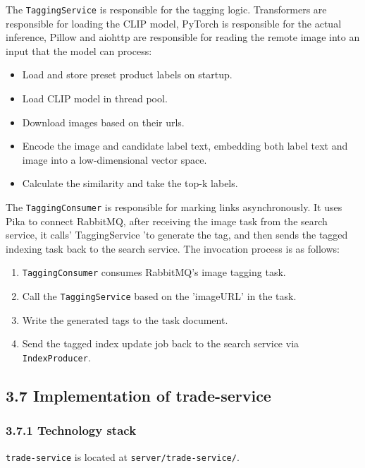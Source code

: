 \documentclass{article}
\begin{document}
The \texttt{TaggingService} is responsible for the tagging logic. Transformers are responsible for loading the CLIP model, PyTorch is responsible for the actual inference, Pillow and aiohttp are responsible for reading the remote image into an input that the model can process:

\begin{itemize}
    \item Load and store preset product labels on startup.
    \item Load CLIP model in thread pool.
    \item Download images based on their urls.
    \item Encode the image and candidate label text, embedding both label text and image into a low-dimensional vector space.
    \item Calculate the similarity and take the top-k labels.
\end{itemize}

The \texttt{TaggingConsumer} is responsible for marking links asynchronously. It uses Pika to connect RabbitMQ, after receiving the image task from the search service, it calls' TaggingService 'to generate the tag, and then sends the tagged indexing task back to the search service. The invocation process is as follows:

\begin{enumerate}
    \item \texttt{TaggingConsumer} consumes RabbitMQ's image tagging task.
    \item Call the \texttt{TaggingService} based on the 'imageURL' in the task.
    \item Write the generated tags to the task document.
    \item Send the tagged index update job back to the search service via \texttt{IndexProducer}.
\end{enumerate}

\subsection{3.7 Implementation of trade-service}

\subsubsection{3.7.1 Technology stack}

\texttt{trade-service} is located at \texttt{server/trade-service/}.
\end{document}
